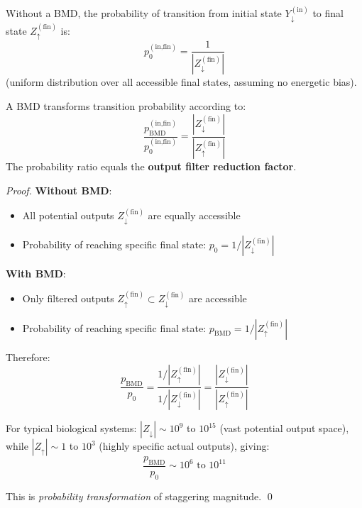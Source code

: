 \begin{definition}
\label{def:baseline_prob}
Without a BMD, the probability of transition from initial state $Y_{\downarrow}^{(\text{in})}$ to final state $Z_{\uparrow}^{(\text{fin})}$ is:
\begin{equation}
p_0^{(\text{in,fin})} = \frac{1}{|Z_{\downarrow}^{(\text{fin})}|}
\end{equation}
(uniform distribution over all accessible final states, assuming no energetic bias).
\end{definition}

\begin{theorem}
\label{thm:bmd_probability}
A BMD transforms transition probability according to:
\begin{equation}
\frac{p_{\text{BMD}}^{(\text{in,fin})}}{p_0^{(\text{in,fin})} } = \frac{|Z_{\downarrow}^{(\text{fin})}|}{|Z_{\uparrow}^{(\text{fin})}|}
\end{equation}
The probability ratio equals the \textbf{output filter reduction factor}.
\end{theorem}

\begin{proof}
\textbf{Without BMD}:
\begin{itemize}
\item All potential outputs $Z_{\downarrow}^{(\text{fin})}$ are equally accessible
\item Probability of reaching specific final state: $p_0 = 1/|Z_{\downarrow}^{(\text{fin})}|$
\end{itemize}

\textbf{With BMD}:
\begin{itemize}
\item Only filtered outputs $Z_{\uparrow}^{(\text{fin})} \subset Z_{\downarrow}^{(\text{fin})}$ are accessible
\item Probability of reaching specific final state: $p_{\text{BMD}} = 1/|Z_{\uparrow}^{(\text{fin})}|$
\end{itemize}

Therefore:
\begin{equation}
\frac{p_{\text{BMD}}}{p_0} = \frac{1/|Z_{\uparrow}^{(\text{fin})}|}{1/|Z_{\downarrow}^{(\text{fin})}|} = \frac{|Z_{\downarrow}^{(\text{fin})}|}{|Z_{\uparrow}^{(\text{fin})}|}
\end{equation}

For typical biological systems: $|Z_{\downarrow}| \sim 10^{9}$ to $10^{15}$ (vast potential output space), while $|Z_{\uparrow}| \sim 1$ to $10^3$ (highly specific actual outputs), giving:
\begin{equation}
\frac{p_{\text{BMD}}}{p_0} \sim 10^6 \text{ to } 10^{11}
\end{equation}

This is \textit{probability transformation} of staggering magnitude. \qed
\end{proof}

